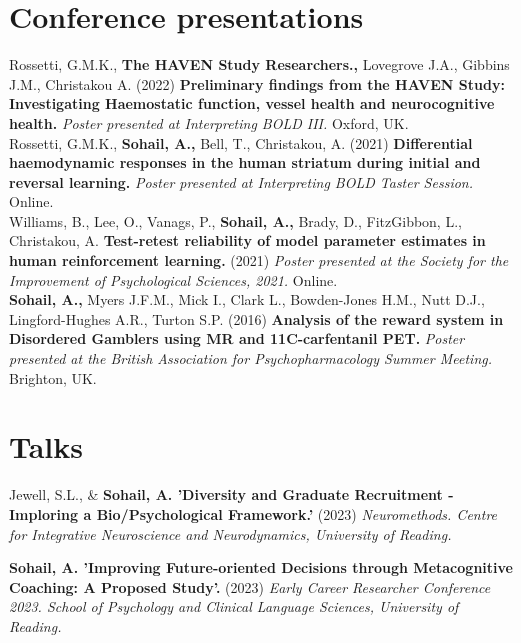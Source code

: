 \documentclass[a4paper,10pt]{article}
\begin{document}
\section{Conference presentations}
\vspace{2pt}
Rossetti, G.M.K., \textbf{The HAVEN Study Researchers.,} Lovegrove J.A., Gibbins J.M., Christakou A. (2022) \textbf{Preliminary
findings from the HAVEN Study: Investigating Haemostatic function, vessel health and neurocognitive health.}
\textit{Poster presented at Interpreting BOLD III.} Oxford, UK. \\
\vspace{8pt}
Rossetti, G.M.K., \textbf{Sohail, A.,} Bell, T., Christakou, A. (2021) \textbf{Differential haemodynamic responses in the human striatum
during initial and reversal learning.} \textit{Poster presented at Interpreting BOLD Taster Session.} Online. \\
\vspace{8pt}
Williams, B., Lee, O., Vanags, P., \textbf{Sohail, A.,} Brady, D., FitzGibbon, L., Christakou, A. \textbf{Test-retest reliability of
model parameter estimates in human reinforcement learning.} (2021) \textit{Poster presented at the Society for the Improvement 
of Psychological Sciences, 2021.} Online. \\
\vspace{8pt}
\textbf{Sohail, A.,} Myers J.F.M., Mick I., Clark L., Bowden-Jones H.M., Nutt D.J., Lingford-Hughes A.R., Turton S.P. (2016)
\textbf{Analysis of the reward system in Disordered Gamblers using MR and 11C-carfentanil PET.} \textit{Poster presented at the British 
Association for Psychopharmacology Summer Meeting.} Brighton, UK.
\vspace{4pt}

\section{Talks}
\vspace{2pt}
Jewell, S.L., \& \textbf{Sohail, A. 'Diversity and Graduate Recruitment - Imploring a Bio/Psychological Framework.'} (2023)
\textit{Neuromethods. Centre for Integrative Neuroscience and Neurodynamics, University of Reading.}
\vspace{8pt}

\textbf{Sohail, A. 'Improving Future-oriented Decisions through Metacognitive Coaching: A Proposed Study'.} (2023)
\textit{Early Career Researcher Conference 2023. School of Psychology and Clinical Language Sciences, University of Reading.}
\vspace{8pt}
\end{document}
